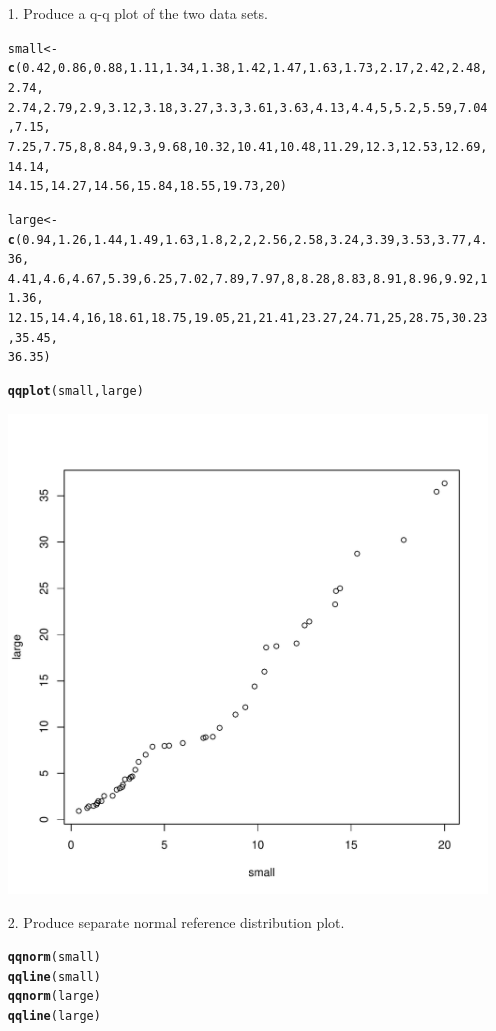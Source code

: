\documentclass{article}\usepackage{graphicx, color}
\makeatletter
\newcommand{\hlfunctioncall}[1]{\textcolor[rgb]{0.501960784313725,0,0.329411764705882}{\textbf{#1}}}%
\newenvironment{kframe}{%
 \def\at@end@of@kframe{}%
 \ifinner\ifhmode%
  \def\at@end@of@kframe{\end{minipage}}%
  \begin{minipage}{\columnwidth}%
 \fi\fi%
 \def\FrameCommand##1{\hskip\@totalleftmargin \hskip-\fboxsep
 \colorbox{shadecolor}{##1}\hskip-\fboxsep
     \hskip-\linewidth \hskip-\@totalleftmargin \hskip\columnwidth}%
 \MakeFramed {\advance\hsize-\width
   \@totalleftmargin\z@ \linewidth\hsize
   \@setminipage}}%
 {\par\unskip\endMakeFramed%
 \at@end@of@kframe}
\newenvironment{knitrout}{}{} %
\def\vvn{\vskip0mm\noindent}
\makeatother
\begin{document}
  \normalsize
\vvn
\begin{enumerate}
\item[1.] Produce a q-q plot of the two data sets.
\begin{shaded}
\begin{knitrout}
\color{fgcolor}\begin{kframe}
\begin{alltt}
small <- \hlfunctioncall{c}(0.42, 0.86, 0.88, 1.11, 1.34, 1.38, 1.42, 1.47, 1.63, 1.73, 2.17, 2.42, 2.48, 2.74, 
    2.74, 2.79, 2.9, 3.12, 3.18, 3.27, 3.3, 3.61, 3.63, 4.13, 4.4, 5, 5.2, 5.59, 7.04, 7.15, 
    7.25, 7.75, 8, 8.84, 9.3, 9.68, 10.32, 10.41, 10.48, 11.29, 12.3, 12.53, 12.69, 14.14, 
    14.15, 14.27, 14.56, 15.84, 18.55, 19.73, 20)

large <- \hlfunctioncall{c}(0.94, 1.26, 1.44, 1.49, 1.63, 1.8, 2, 2, 2.56, 2.58, 3.24, 3.39, 3.53, 3.77, 4.36, 
    4.41, 4.6, 4.67, 5.39, 6.25, 7.02, 7.89, 7.97, 8, 8.28, 8.83, 8.91, 8.96, 9.92, 11.36, 
    12.15, 14.4, 16, 18.61, 18.75, 19.05, 21, 21.41, 23.27, 24.71, 25, 28.75, 30.23, 35.45, 
    36.35)

\hlfunctioncall{qqplot}(small, large)
\end{alltt}
\end{kframe}

{\centering \includegraphics[width=.65\textwidth]{figure/unnamed-chunk-1} 

}


\end{knitrout}


\end{shaded}
\item[2.] Produce separate normal reference distribution plot.
\begin{shaded}
\begin{knitrout}
\color{fgcolor}\begin{kframe}
\begin{alltt}
\hlfunctioncall{qqnorm}(small)
\hlfunctioncall{qqline}(small)
\hlfunctioncall{qqnorm}(large)
\hlfunctioncall{qqline}(large)
\end{alltt}
\end{kframe}


\end{knitrout}
\end{shaded}
\end{enumerate}
\end{document}
